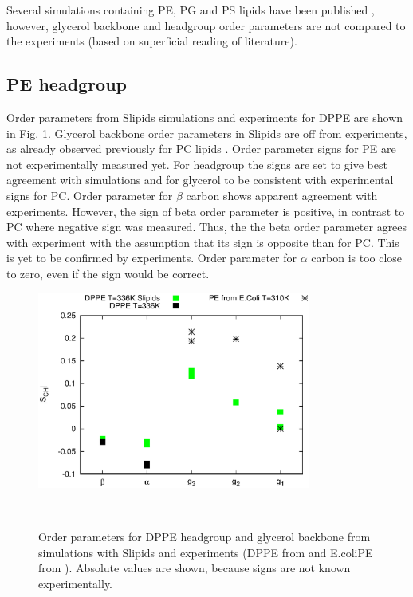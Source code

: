 \documentclass[aps,prl,superscriptaddress,twocolumn]{revtex4}
\begin{document}
Several simulations containing PE, PG and PS lipids have been published \cite{??}, 
however, glycerol backbone and headgroup order parameters are not compared to
the experiments (based on superficial reading of literature).

\subsection{PE headgroup}
Order parameters from Slipids simulations 
and experiments for DPPE are shown in Fig. \ref{HGorderParametersPE}.
Glycerol backbone order parameters in Slipids are off from experiments,
as already observed previously for PC lipids \cite{botan15}.
Order parameter signs for PE are not experimentally measured yet.
For headgroup the signs are set to give best agreement with simulations
and for glycerol to be consistent with experimental signs for PC.
Order parameter for $\beta$ carbon shows apparent agreement
with experiments. However, the sign of beta order parameter is positive,
in contrast to PC where negative sign was measured. Thus, the the beta order
parameter agrees with experiment with the assumption that its sign is opposite
than for PC. This is yet to be confirmed by experiments.
Order parameter for $\alpha$ carbon is too close to zero, even if the sign
would be correct.

\begin{figure}[]
  \centering
  \includegraphics[width=9.0cm]{../Figs/HGorderparametersPE.eps}
  \caption{\label{HGorderParametersPE}
    Order parameters for DPPE headgroup and glycerol
    backbone from simulations with Slipids \cite{??} and experiments
    (DPPE from \cite{seelig76} and E.coliPE from \cite{gally81}).
    Absolute values are shown, because signs are not known experimentally.
  }
   \\
\end{figure}
\end{document}
